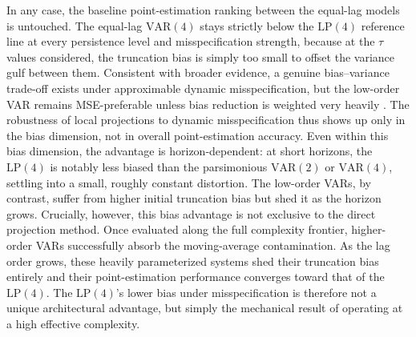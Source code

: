In any case, the baseline point-estimation ranking between the equal-lag models is untouched. The equal-lag $\text{VAR}(4)$ stays strictly below the $\text{LP}(4)$ reference line at every persistence level and misspecification strength, because at the $\tau$ values considered, the truncation bias is simply too small to offset the variance gulf between them. Consistent with broader evidence, a genuine bias--variance trade-off exists under approximable dynamic misspecification, but the low-order VAR remains MSE-preferable unless bias reduction is weighted very heavily \parencite{li2024local}. The robustness of local projections to dynamic misspecification thus shows up only in the bias dimension, not in overall point-estimation accuracy. Even within this bias dimension, the advantage is horizon-dependent: at short horizons, the $\text{LP}(4)$ is notably less biased than the parsimonious $\text{VAR}(2)$ or $\text{VAR}(4)$, settling into a small, roughly constant distortion. The low-order VARs, by contrast, suffer from higher initial truncation bias but shed it as the horizon grows. Crucially, however, this bias advantage is not exclusive to the direct projection method. Once evaluated along the full complexity frontier, higher-order VARs successfully absorb the moving-average contamination. As the lag order grows, these heavily parameterized systems shed their truncation bias entirely and their point-estimation performance converges toward that of the $\text{LP}(4)$. The $\text{LP}(4)$'s lower bias under misspecification is therefore not a unique architectural advantage, but simply the mechanical result of operating at a high effective complexity.

